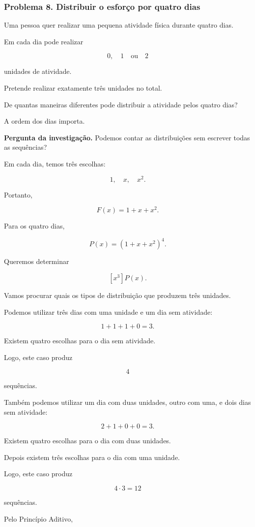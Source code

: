 \documentclass[11pt,a4paper,oneside]{book}
\newcommand{\Pergunta}[1]{\begin{perguntabox}\textbf{Pergunta da investigação.} #1\end{perguntabox}}
\begin{document}
\subsubsection*{Problema 8. Distribuir o esforço por quatro dias}

Uma pessoa quer realizar uma pequena
atividade física durante quatro dias.

Em cada dia pode realizar

\[
0,\quad1\quad\text{ou}\quad2
\]

unidades de atividade.

Pretende realizar exatamente
três unidades no total.

De quantas maneiras diferentes
pode distribuir a atividade
pelos quatro dias?

A ordem dos dias importa.

\Pergunta{Podemos contar as distribuições
sem escrever todas as sequências?}

Em cada dia, temos três escolhas:

\[
1,\quad x,\quad x^2.
\]

Portanto,

\[
F(x)=1+x+x^2.
\]

Para os quatro dias,

\[
P(x)=(1+x+x^2)^4.
\]

Queremos determinar

\[
[x^3]P(x).
\]

Vamos procurar quais os tipos de
distribuição que produzem três unidades.

Podemos utilizar três dias
com uma unidade e um dia
sem atividade:

\[
1+1+1+0=3.
\]

Existem quatro escolhas para
o dia sem atividade.

Logo, este caso produz

\[
4
\]

sequências.

Também podemos utilizar um dia
com duas unidades, outro com uma,
e dois dias sem atividade:

\[
2+1+0+0=3.
\]

Existem quatro escolhas para
o dia com duas unidades.

Depois existem três escolhas
para o dia com uma unidade.

Logo, este caso produz

\[
4\cdot3=12
\]

sequências.

Pelo Princípio Aditivo,
\end{document}
